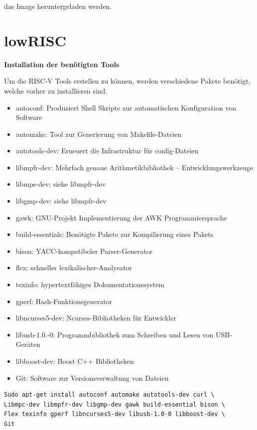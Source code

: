 das Image heruntergeladen werden.
\newpage
\section{lowRISC}\label{kap:lowrisc}

\textbf{Installation der benötigten Tools}

Um die RISC-V Tools erstellen zu können, werden verschiedene Pakete benötigt, welche vorher zu installieren sind.
\begin{itemize}
  \item autoconf: Produziert Shell Skripte zur automatischen Konfiguration von Software
  \item automake: Tool zur Generierung von Makefile-Dateien
  \item autotools-dev: Erneuert die Infrastruktur für config-Dateien
  \item libmpfr-dev: Mehrfach genaue Arithmetikbibliothek – Entwicklungswerkzeuge
  \item libmps-dev: siehe libmpfr-dev
  \item libgmp-dev: siehe libmpfr-dev
  \item gawk: GNU-Projekt Implementierung der AWK Programmiersprache
  \item build-essentials: Benötigte Pakete zur Kompilierung eines Pakets
  \item bison: YACC-kompatibeler Parser-Generator
  \item flex: schneller lexikalischer-Analysator
  \item texinfo: hypertextfähiges Dokumentationssystem
  \item gperf: Hash-Funktionsgenerator
  \item libncurses5-dev: Ncurses-Bibliotheken für Entwickler
  \item libusb-1.0.-0: Programmbibliothek zum Schreiben und Lesen von USB-Geräten
  \item libboost-dev: Boost C++ Bibliotheken
  \item Git: Software zur Versionsverwaltung von Dateien
\end{itemize}


\begin{lstlisting}[caption={Installation der benötigten RISC-V-Tools},label={code:riscvtools}]
Sudo apt-get install autoconf automake autotools-dev curl \
Libmpc-dev libmpfr-dev libgmp-dev gawk build-essential bison \
Flex texinfo gperf libncurses5-dev libusb-1.0-0 libboost-dev \
Git
\end{lstlisting}


